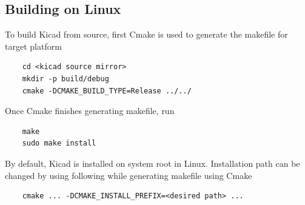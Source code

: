 \documentclass[12pt,a4paper]{report}
\begin{document}
\subsection{Building on Linux}
To build Kicad from source, first Cmake is used to generate the makefile for target platform\\
\begin{verbatim}
    cd <kicad source mirror>
    mkdir -p build/debug
    cmake -DCMAKE_BUILD_TYPE=Release ../../
\end{verbatim}
Once Cmake finishes generating makefile, run\\
\begin{verbatim}
    make
    sudo make install
\end{verbatim}
By default, Kicad is installed on system root in Linux. Installation path can be changed by using following while generating makefile using Cmake\\
\begin{verbatim}
    cmake ... -DCMAKE_INSTALL_PREFIX=<desired path> ...
\end{verbatim}
\end{document}
